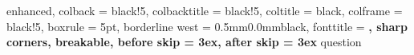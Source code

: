 \usepackage{titlesec}
\usepackage[many]{tcolorbox}
\usepackage{lipsum}

\titlespacing*{\chapter}{0cm}{-2.0cm}{0.50cm}

\setlength{\parindent}{0pt}
\setlength{\parskip}{1ex}


%
    {enhanced,
    colback = black!5, %
    colbacktitle = black!5,
    coltitle = black,
    colframe = black!5,
    boxrule = 5pt,
    borderline west = {0.5mm}{0.0mm}{black},
    fonttitle = \bfseries\sffamily,
    sharp corners,
    breakable,
    before skip = 3ex,
    after skip = 3ex
}{question}


